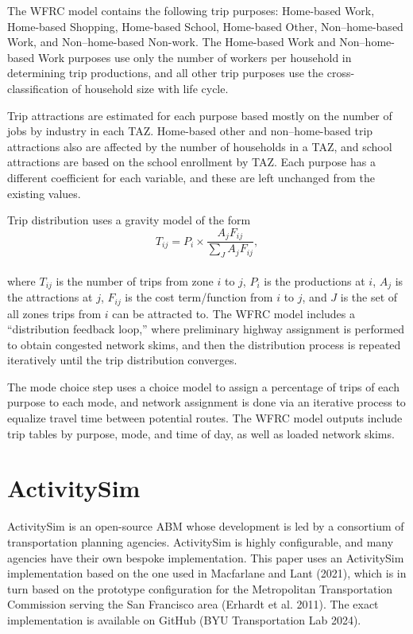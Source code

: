 \documentclass[fancy, twoside, mastersfancy, ms]{byuthesis}
\begin{document}
The WFRC model contains the following trip purposes: Home-based Work,
Home-based Shopping, Home-based School, Home-based Other,
Non--home-based Work, and Non--home-based Non-work. The Home-based Work
and Non--home-based Work purposes use only the number of workers per
household in determining trip productions, and all other trip purposes
use the cross-classification of household size with life cycle.

Trip attractions are estimated for each purpose based mostly on the
number of jobs by industry in each TAZ. Home-based other and
non--home-based trip attractions also are affected by the number of
households in a TAZ, and school attractions are based on the school
enrollment by TAZ. Each purpose has a different coefficient for each
variable, and these are left unchanged from the existing values.

Trip distribution uses a gravity model of the form\\
\[
T_{ij} = P_i \times \frac{A_j  F_{ij}}{\displaystyle \sum_J A_j  F_{ij}},
\]\\
where \(T_{ij}\) is the number of trips from zone \(i\) to \(j\),
\(P_i\) is the productions at \(i\), \(A_j\) is the attractions at
\(j\), \(F_{ij}\) is the cost term/function from \(i\) to \(j\), and
\(J\) is the set of all zones trips from \(i\) can be attracted to. The
WFRC model includes a ``distribution feedback loop,'' where preliminary
highway assignment is performed to obtain congested network skims, and
then the distribution process is repeated iteratively until the trip
distribution converges.

The mode choice step uses a choice model to assign a percentage of trips
of each purpose to each mode, and network assignment is done via an
iterative process to equalize travel time between potential routes. The
WFRC model outputs include trip tables by purpose, mode, and time of
day, as well as loaded network skims.

\section{ActivitySim}\label{sec-activitysim}

ActivitySim is an open-source ABM whose development is led by a
consortium of transportation planning agencies. ActivitySim is highly
configurable, and many agencies have their own bespoke implementation.
This paper uses an ActivitySim implementation based on the one used in
Macfarlane and Lant (2021), which is in turn based on the prototype
configuration for the Metropolitan Transportation Commission serving the
San Francisco area (Erhardt et al. 2011). The exact implementation is
available on GitHub (BYU Transportation Lab 2024).
\end{document}
